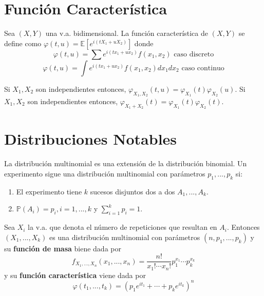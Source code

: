 \section{Función Característica}

\begin{defn}
Sea $(X,Y)$ una v.a. bidimensional. La función característica de $(X,Y)$ se define como $\varphi(t,u) = \mathbb{E}[e^{i(tX_1 + uX_2)}]$ donde \[ \varphi(t,u) = \sum e^{i(tx_1 + ux_2)}f(x_1,x_2) \text{ caso discreto} \] \[ \varphi(t,u) = \int e^{i(tx_1 + ux_2)}f(x_1,x_2)dx_1 dx_2 \text{ caso continuo} \]
\end{defn}

\begin{obs}
Si $X_1,X_2$ son independientes entonces, $\varphi_{X_1,X_2}(t,u) = \varphi_{X_1}(t)\varphi_{X_2}(u)$.
Si $X_1,X_2$ son independientes entonces, $\varphi_{X_1 + X_2}(t) = \varphi_{X_1}(t)\varphi_{X_2}(t)$.
\end{obs}

\begin{ejr}

\end{ejr}

\begin{ejr}

\end{ejr}

\section{Distribuciones Notables}

\begin{defn}[Multinomial]
La distribución multinomial es una extensión de la distribución binomial. Un experimento sigue una distribución multinomial con parámetros $p_1,...,p_k$ si: 

\begin{enumerate}[label=(\roman*)]
    \item El experimento tiene $k$ sucesos disjuntos dos a dos $A_1,...,A_k$.
    \item $\mathbb{P}(A_i) = p_i, i=1,...,k$ y $\sum_{i=1}^k p_i = 1$.
\end{enumerate}

Sea $X_i$ la v.a. que denota el número de repeticiones que resultan en $A_i$. Entonces $(X_1,...,X_k)$ es una distribución multinomial con parámetros $(n,p_1,...,p_k)$ y su \textbf{función de masa} biene dada por \[ f_{X_1,...,X_n}(x_1,...,x_n) = \frac{n!}{x_1!\cdots x_n!}p_1^{x_1}\cdots p_k^{x_k} \] y su \textbf{función característica} viene dada por \[ \varphi(t_1,...,t_k) = (p_1e^{it_1} + \cdots + p_ke^{it_k})^n \] 
\end{defn}

